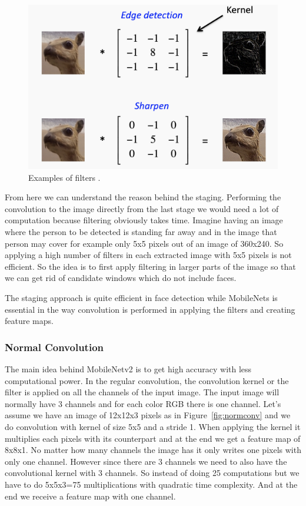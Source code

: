 \begin{figure}[!htb]
    \centering
    \includegraphics[width=1\textwidth]{figures/filters.png}
    \caption{Examples of filters \cite{simpleconvolution}.}
    \label{fig:filter}
\end{figure}
From here we can understand the reason behind the staging. Performing the convolution to the image directly from the last stage we would need a lot of computation because filtering obviously takes time. Imagine having an image where the person to be detected is standing far away and in the image that person may cover for example only 5x5 pixels out of an image of 360x240. So applying a high number of filters in each extracted image with 5x5 pixels is not efficient. So the idea is to first apply filtering in larger parts of the image so that we can get rid of candidate windows which do not include faces.

The staging approach is quite efficient in face detection while MobileNets is essential in the way convolution is performed in applying the filters and creating feature maps. 



\subsubsection{Normal Convolution}

The main idea behind MobileNetv2 is to get high accuracy with less computational power. In the regular convolution, the convolution kernel or the filter is applied on all the channels of the input image. The input image will normally have 3 channels and for each color RGB there is one channel. Let's assume we have an image of 12x12x3 pixels as in Figure~\ref{fig:normconv} and we do convolution with kernel of size 5x5 and a stride 1. When applying the kernel it multiplies each pixels with its counterpart and at the end we get a feature map of 8x8x1. No matter how many channels the image has it only writes one pixels with only one channel.
However since there are 3 channels we need to also have the convolutional kernel with 3 channels. So instead of doing 25 computations but we have to do 5x5x3=75 multiplications with quadratic time complexity. And at the end we receive a feature map with one channel. 

